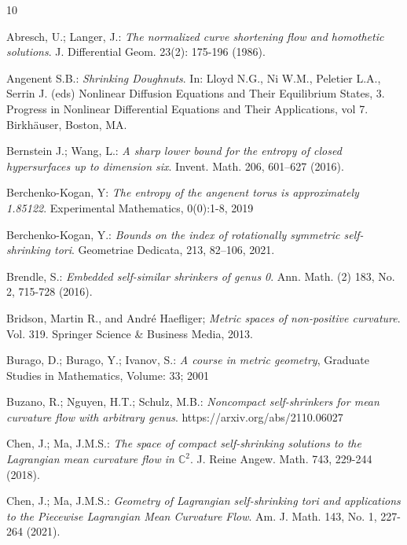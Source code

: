 \documentclass[12pt]{amsart}
\numberwithin{equation}{section}
\theoremstyle{remark}
\begin{document}
	
	\begin{thebibliography}{10}
		
		Abresch, U.; Langer, J.:
		{\sl The normalized curve shortening flow and homothetic solutions}. J. Differential Geom. 23(2): 175-196 (1986).
		
		Angenent S.B.: {\sl Shrinking Doughnuts}. In: Lloyd N.G., Ni W.M., Peletier L.A., Serrin J. (eds) Nonlinear Diffusion Equations and Their Equilibrium States, 3. Progress in Nonlinear Differential Equations and Their Applications, vol 7. Birkhäuser, Boston, MA.
		
		Bernstein J.; Wang, L.:
		{\sl A sharp lower bound for the entropy of closed hypersurfaces up to dimension six}. Invent. Math. 206, 601--627 (2016).
		
		
		Berchenko-Kogan, Y: 
		{\sl The entropy of the angenent torus is approximately 1.85122}. Experimental Mathematics, 0(0):1-8, 2019
		
		Berchenko-Kogan, Y.:
		{\sl Bounds on the index of rotationally symmetric self-shrinking tori}. Geometriae Dedicata, 213, 82–106, 2021.
		
		Brendle, S.:
		{\sl Embedded self-similar shrinkers of genus 0}. Ann. Math. (2) 183, No. 2, 715-728 (2016).
		
		Bridson, Martin R., and Andr{\' e} Haefliger; 
		{\sl Metric spaces of non-positive curvature}. Vol. 319. Springer Science \& Business Media, 2013.
		
		Burago, D.; Burago, Y.; Ivanov, S.: 
		{\sl A course in metric geometry}, Graduate Studies in Mathematics, Volume: 33; 2001
		
		
		Buzano, R.; Nguyen, H.T.; Schulz, M.B.:
		{\sl Noncompact self-shrinkers for mean curvature flow with arbitrary genus}. https://arxiv.org/abs/2110.06027
		
		Chen, J.; Ma, J.M.S.: 
		{\sl The space of compact self-shrinking solutions to the Lagrangian mean curvature flow in $\mathbb C^2$}. J. Reine Angew. Math. 743, 229-244 (2018).
		
		Chen, J.; Ma, J.M.S.:
		{\sl Geometry of Lagrangian self-shrinking tori and applications to the Piecewise Lagrangian Mean Curvature Flow}. Am. J. Math. 143, No. 1, 227-264 (2021).
		

\end{thebibliography}
\end{document}
